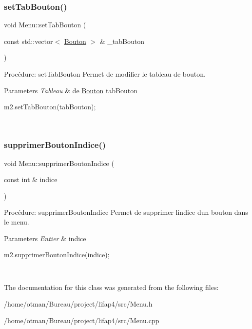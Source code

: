 \subsubsection{\texorpdfstring{set\+Tab\+Bouton()}{setTabBouton()}}
{\footnotesize\ttfamily void Menu\+::set\+Tab\+Bouton (\begin{DoxyParamCaption}\item[{const std\+::vector$<$ \hyperlink{classBouton}{Bouton} $>$ \&}]{\+\_\+tab\+Bouton }\end{DoxyParamCaption})}



Procédure\+: set\+Tab\+Bouton Permet de modifier le tableau de bouton. 


\begin{DoxyParams}{Parameters}
{\em Tableau} & de \hyperlink{classBouton}{Bouton} tab\+Bouton 
\begin{DoxyCode}
m2.setTabBouton(tabBouton);
\end{DoxyCode}
 \\
\hline
\end{DoxyParams}
\mbox{\label{classMenu_a1ed5172963be698f6fbabcf5a87ff664}} 
\subsubsection{\texorpdfstring{supprimer\+Bouton\+Indice()}{supprimerBoutonIndice()}}
{\footnotesize\ttfamily void Menu\+::supprimer\+Bouton\+Indice (\begin{DoxyParamCaption}\item[{const int \&}]{indice }\end{DoxyParamCaption})}



Procédure\+: supprimer\+Bouton\+Indice Permet de supprimer l\textquotesingle{}indice d\textquotesingle{}un bouton dans le menu. 


\begin{DoxyParams}{Parameters}
{\em Entier} & indice 
\begin{DoxyCode}
m2.supprimerBoutonIndice(indice);
\end{DoxyCode}
 \\
\hline
\end{DoxyParams}


The documentation for this class was generated from the following files\+:\begin{DoxyCompactItemize}
\item 
/home/otman/\+Bureau/project/lifap4/src/Menu.\+h\item 
/home/otman/\+Bureau/project/lifap4/src/Menu.\+cpp\end{DoxyCompactItemize}
